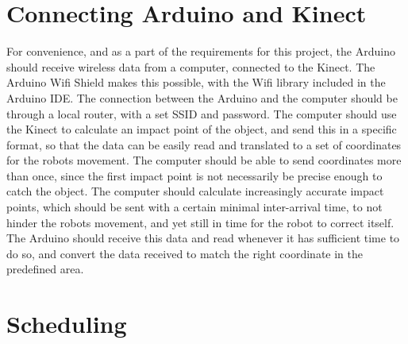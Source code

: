 \section{Connecting Arduino and Kinect}
\label{sec:Connecting Arduino and Kinect}
For convenience, and as a part of the requirements for this project, the Arduino should receive wireless data from a computer, connected to the Kinect. The Arduino Wifi Shield makes this possible, with the Wifi library included in the Arduino IDE. \newline
The connection between the Arduino and the computer should be through a local router, with a set SSID and password. The computer should use the Kinect to calculate an impact point of the object, and send this in a specific format, so that the data can be easily read and translated to a set of coordinates for the robots movement. The computer should be able to send coordinates more than once, since the first impact point is not necessarily be precise enough to catch the object. The computer should calculate increasingly accurate impact points, which should be sent with a certain minimal inter-arrival time, to not hinder the robots movement, and yet still in time for the robot to correct itself. \newline
The Arduino should receive this data and read whenever it has sufficient time to do so, and convert the data received to match the right coordinate in the predefined area. 

\section{Scheduling}
\label{sec:Scheduling}
